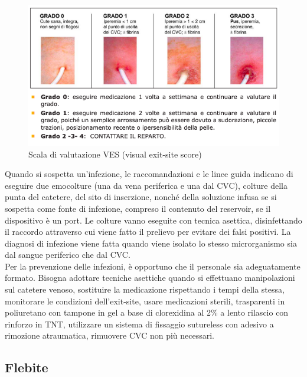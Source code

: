 \begin{figure}[H]
    \begin{center}
    \includegraphics[width=0.8\columnwidth]{img/VES.png}
    \vspace{-3mm}
    \end{center}
    \caption{Scala di valutazione VES (visual exit-site score)
    \cite{img51}}

\end{figure}

Quando si sospetta un’infezione, le raccomandazioni e le linee guida indicano di eseguire due emocolture 
(una da vena periferica e una dal CVC), colture della punta del catetere, del sito di inserzione, nonché della 
soluzione infusa se si sospetta come fonte di infezione, compreso il contenuto del reservoir, se il dispositivo è un 
port. Le colture vanno eseguite con tecnica asettica, disinfettando il raccordo attraverso cui viene fatto il 
prelievo per evitare dei falsi positivi. La diagnosi di infezione viene fatta quando viene isolato lo stesso 
microrganismo sia dal sangue periferico che dal CVC\cite{AIOMCVC}.\\
Per la prevenzione delle infezioni, è opportuno che il personale sia adeguatamente formato. Bisogna adottare tecniche 
asettiche quando si effettuano manipolazioni sul catetere venoso, sostituire la medicazione rispettando i tempi della 
stessa, monitorare le condizioni dell’exit-site, usare medicazioni sterili, trasparenti in poliuretano con tampone 
in gel a base di clorexidina al 2\% a lento rilascio con rinforzo in TNT, utilizzare un sistema di fissaggio 
sutureless con adesivo a rimozione atraumatica, rimuovere CVC non più necessari\cite{AIOMCVC}.

\subsection{Flebite}

